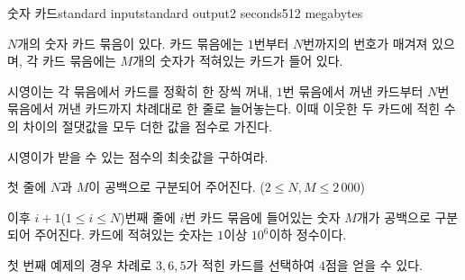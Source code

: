 \begin{problem}{숫자 카드}{standard input}{standard output}{2 seconds}{512 megabytes}

$N$개의 숫자 카드 묶음이 있다. 카드 묶음에는 $1$번부터 $N$번까지의 번호가 매겨져 있으며, 각 카드 묶음에는 $M$개의 숫자가 적혀있는 카드가 들어 있다.

시영이는 각 묶음에서 카드를 정확히 한 장씩 꺼내, $1$번 묶음에서 꺼낸 카드부터 $N$번 묶음에서 꺼낸 카드까지 차례대로 한 줄로 늘어놓는다. 이때 이웃한 두 카드에 적힌 수의 차이의 절댓값을 모두 더한 값을 점수로 가진다.

시영이가 받을 수 있는 점수의 최솟값을 구하여라.

\InputFile
첫 줄에 $N$과 $M$이 공백으로 구분되어 주어진다. ($2 \le N, M \le 2\,000$)

이후 $i+1$($1 \le i \le N$)번째 줄에 $i$번 카드 묶음에 들어있는 숫자 $M$개가 공백으로 구분되어 주어진다. 카드에 적혀있는 숫자는 $1$이상 $10^6$이하 정수이다.

\Example

\begin{example}
%
\end{example}

\Note
첫 번째 예제의 경우 차례로 $3, 6, 5$가 적힌 카드를 선택하여 $4$점을 얻을 수 있다.

\end{problem}

